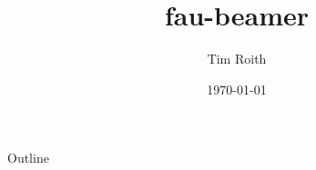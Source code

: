 \documentclass[final, 12pt]{beamer}
\title[Short title]{fau-beamer}
\author[Author in foot]{Tim Roith}
\institute[Short institute name]{FAU}
\date{\today}
\begin{document}
\begin{trueplainframe}{}
\titlepage%
\end{trueplainframe}
\begin{frame}{Outline}
\tableofcontents
\end{frame}

\end{document}
